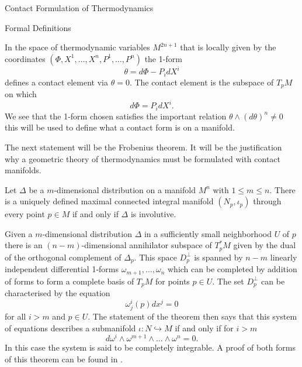 \begin{section}{Contact Formulation of Thermodynamics}
\begin{subsection}{Formal Definitions}
\begin{corollary}
\end{corollary}
\begin{example}
	In the space of thermodynamic variables $M^{2n+1}$ that is locally given by the coordinates $(\Phi,X^1,\dots,X^n,P^1,\dots,P^n)$ the 1-form
	\begin{equation}
		\theta = d\Phi - P_idX^i
	\end{equation}
	defines a contact element via $\theta=0$. The contact element is the subspace of $T_pM$ on which
	\begin{equation}
		d\Phi = P_idX^i.
	\end{equation}
	We see that the 1-form chosen satisfies the important relation $\theta\wedge(d\theta)^n\neq0$ this will be used to define what a contact form is on a manifold.
\end{example}
The next statement will be the Frobenius theorem. It will be the justification why a geometric theory of thermodynamics must be formulated with contact manifolds.
\begin{theorem}
		Let $\Delta$ be a $m$-dimensional distribution on a manifold $M^n$ with $1\leq m\leq n$. There is a uniquely defined maximal connected integral manifold $(N_p,\iota_p)$ through every point $p\in M$ if and only if $\Delta$ is involutive.
\end{theorem}
\begin{theorem}
	Given a $m$-dimensional distribution $\Delta$ in a sufficiently small neighborhood $U$ of $p$ there is an $(n-m)$-dimensional annihilator subspace of $T^*_pM$ given by the dual of the orthogonal complement of $\Delta_p$. This space $D^\perp_p$ is spanned by $n-m$ linearly independent differential 1-forms $\omega_{m+1},\dots,\omega_n$ which can be completed by addition of forms to form a complete basis of $T_pM$ for points $p\in U$. The set $D^\perp_p$ can be characterised by the equation
	\begin{equation}
		\omega^i_j(p)dx^j = 0
	\end{equation}
	for all $i>m$ and $p\in U$. The statement of the theorem then says that this system of equations describes a submanifold $\iota:N\hookrightarrow M$ if and only if for $i>m$
	\begin{equation}
		d\omega^i\wedge\omega^{m+1}\wedge\dots\wedge\omega^n=0.
		\label{1-GeneralDefinitions-FrobeniusTheoremIntegrabilityCond}
	\end{equation}
	In this case the system is said to be completely integrable. A proof of both forms of this theorem can be found in \cite[p. 78]{eschrigTopologyGeometryPhysics2011}.

\end{theorem}
\end{subsection}
\end{section}
